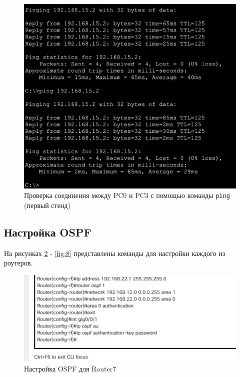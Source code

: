 \documentclass[12pt]{report}
\begin{document}
\begin{figure}[H]
	\begin{center}
		\includegraphics[scale=0.6]{img/4.png}
	\end{center}
	\caption{Проверка соединения между PC0 и PC3 с помощью команды \texttt{ping} (первый стенд)}
	\label{fig:4}
\end{figure}

\subsection*{Настройка OSPF}

На рисунках \ref{fig:5} - \ref{fig:8} представлены команды для настройки каждого из роутеров.

\begin{figure}[H]
	\begin{center}
		\includegraphics[scale=0.8]{img/5_1.jpg}
	\end{center}
	\caption{Настройка OSPF для Router7}
	\label{fig:5}
\end{figure}
\end{document}
